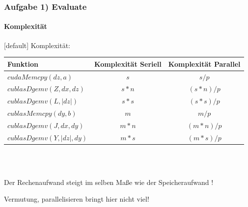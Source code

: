 \begin{frame}
	\frametitle{Aufgabe 1) Evaluate}
	\framesubtitle{Komplexität}
	[default]
	Komplexität:
	\begin{center}
	\begin{tabular}{ l | c | c}
		Funktion & Komplexität Seriell & Komplexität Parallel \\
		\hline
		$cudaMemcpy(dz,a)$	& $s$ & $s/p$  \\
		$cublasDgemv(Z,dx,dz)$& $s*n$ & $(s*n)/p$ \\
		$cublasDgemv(L, |dz|)$& $s*s$ & $(s*s)/p$ \\
		$cublasMemcpy(dy,b)$  & $m$  & $m/p$ \\
		$cublasDgemv(J,dx,dy)$& $m*n$ & $(m*n)/p$ \\
		$cublasDgemv(Y, |dz|, dy)$ & $m*s$ & $(m*s)/p$ \\
	\end{tabular} 	\\~\\
	\end{center}
	\pause
	Der Rechenaufwand steigt im selben Maße wie der Speicheraufwand ! \\
	\pause
	\begin{center}
		Vermutung, parallelisieren bringt hier nicht viel!
	\end{center}
\end{frame}
\begin{frame}[plain]
\end{frame}
\begin{frame}[plain]
\end{frame}
